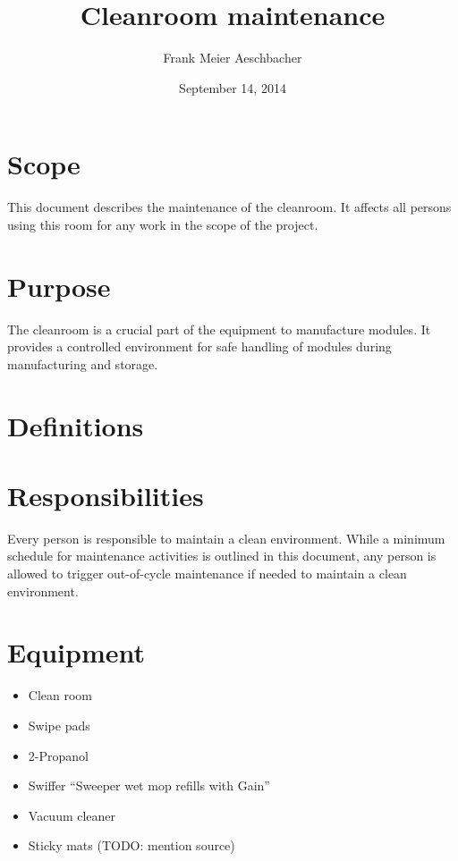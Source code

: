 \documentclass[12pt]{unlsilabsop}
\title{Cleanroom maintenance}
\date{September 14, 2014}
\author{Frank Meier Aeschbacher}
\begin{document}
\maketitle

\section{Scope}
This document describes the maintenance of the cleanroom. It affects all persons using this room for any work in the scope of the project.

\section{Purpose}
The cleanroom is a crucial part of the equipment to manufacture modules. It provides a controlled environment for safe handling of modules during manufacturing and storage.

\section{Definitions}

\section{Responsibilities}
Every person is responsible to maintain a clean environment. While a minimum schedule for maintenance activities is outlined in this document, any person is allowed to trigger out-of-cycle maintenance if needed to maintain a clean environment.

\section{Equipment}

\begin{itemize}
    \item Clean room
    \item Swipe pads
    \item 2-Propanol
    \item Swiffer ``Sweeper wet mop refills with Gain''
    \item Vacuum cleaner
    \item Sticky mats (TODO: mention source)
\end{itemize}
\end{document}
